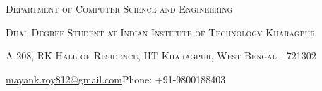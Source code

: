 \documentclass[a4paper,10pt]{extarticle} %
\begin{document}
\pagestyle{empty} %



\par{\par} %
\par{\centering\large {\textsc{Department of Computer Science and Engineering}}\par}\large
\par{\centering\large {\textsc{Dual Degree Student at Indian Institute of Technology Kharagpur}}\par}\large
\par{\centering\large {\textsc{A-208, RK Hall of Residence, IIT Kharagpur, West Bengal - 721302}}\par}\large
\hspace{3.5cm}\normalsize {\href{mailto:mayank.roy812@gmail.com}{mayank.roy812@gmail.com}}\hfill{Phone: +91-9800188403}\hspace{3.5cm}

%

\end{document}
